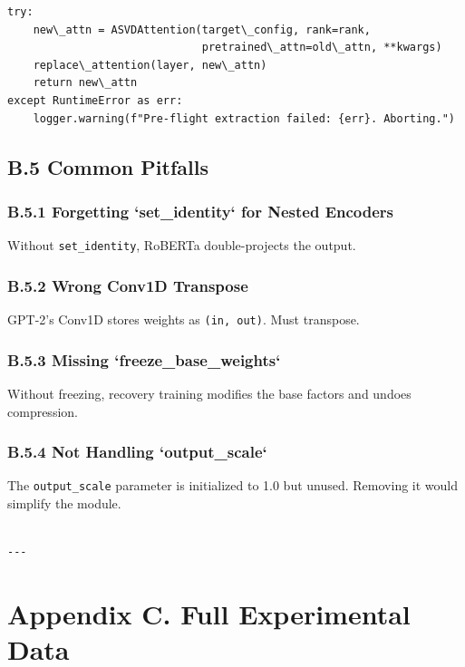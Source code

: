 \begin{lstlisting}
try:
    new\_attn = ASVDAttention(target\_config, rank=rank,
                              pretrained\_attn=old\_attn, **kwargs)
    replace\_attention(layer, new\_attn)
    return new\_attn
except RuntimeError as err:
    logger.warning(f"Pre-flight extraction failed: {err}. Aborting.")
\end{lstlisting}

\subsection{B.5 Common Pitfalls}

\subsubsection{B.5.1 Forgetting `set\_identity` for Nested Encoders}

Without \texttt{set\_identity}, RoBERTa double-projects the output.

\subsubsection{B.5.2 Wrong Conv1D Transpose}

GPT-2's Conv1D stores weights as \texttt{(in, out)}. Must transpose.

\subsubsection{B.5.3 Missing `freeze\_base\_weights`}

Without freezing, recovery training modifies the base factors and undoes 
compression.

\subsubsection{B.5.4 Not Handling `output\_scale`}

The \texttt{output\_scale} parameter is initialized to 1.0 but unused. Removing 
it would simplify the module.
\begin{lstlisting}

---
\end{lstlisting}


\section{Appendix C. Full Experimental Data}

